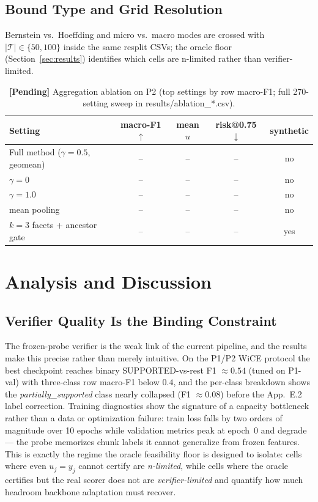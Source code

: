 \documentclass{article}
\begin{document}
\subsection{Bound Type and Grid Resolution}
Bernstein vs.\ Hoeffding and micro vs.\ macro modes are crossed with
$|\mathcal{T}|\in\{50,100\}$ inside the same resplit CSVs; the oracle
floor (Section~\ref{sec:results}) identifies which cells are
n-limited rather than verifier-limited.

\begin{table}[t]
 \caption{\textbf{[Pending]} Aggregation ablation on P2 (top settings by
 row macro-F1; full 270-setting sweep in results/ablation\_*.csv).}
  \centering
  \begin{tabular}{lcccc}
    \toprule
    Setting & macro-F1 $\uparrow$ & mean $u$ & risk@0.75 $\downarrow$ & synthetic \\
    \midrule
    Full method ($\gamma{=}0.5$, geomean) & -- & -- & -- & no \\
    $\gamma{=}0$ & -- & -- & -- & no \\
    $\gamma{=}1.0$ & -- & -- & -- & no \\
    mean pooling & -- & -- & -- & no \\
    $k{=}3$ facets + ancestor gate & -- & -- & -- & yes \\
    \bottomrule
  \end{tabular}
  \label{tab:ablation}
\end{table}

\section{Analysis and Discussion}
\label{sec:analysis}

\subsection{Verifier Quality Is the Binding Constraint}
The frozen-probe verifier is the weak link of the current pipeline, and
the results make this precise rather than merely intuitive. On the P1/P2
WiCE protocol the best checkpoint reaches binary
SUPPORTED-vs-rest F1 $\approx0.54$ (tuned on P1-val) with three-class
row macro-F1 below $0.4$, and the per-class breakdown shows the
\emph{partially\_supported} class nearly collapsed (F1 $\approx0.08$)
before the App.~E.2 label correction. Training diagnostics show the
signature of a capacity bottleneck rather than a data or optimization
failure: train loss falls by two orders of magnitude over 10 epochs
while validation metrics peak at epoch~0 and degrade --- the probe
memorizes chunk labels it cannot generalize from frozen features.
This is exactly the regime the oracle feasibility floor is designed to
isolate: cells where even $u_j{=}y_j$ cannot certify are
\emph{n-limited}, while cells where the oracle certifies but the real
scorer does not are \emph{verifier-limited} and quantify how much
headroom backbone adaptation must recover.
\end{document}

